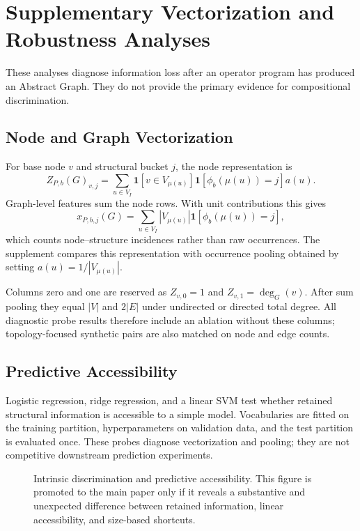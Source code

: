 \section{Supplementary Vectorization and Robustness Analyses}
\label{app:supplementary-results}

These analyses diagnose information loss after an operator program has produced
an Abstract Graph. They do not provide the primary evidence for compositional
discrimination.

\subsection{Node and Graph Vectorization}

For base node $v$ and structural bucket $j$, the node representation is
\begin{equation}
 Z_{P,b}(G)_{v,j}=\sum_{u\in V_I}
 \mathbf{1}[v\in V_{\mu(u)}]
 \mathbf{1}[\phi_b(\mu(u))=j]a(u).
\end{equation}
Graph-level features sum the node rows. With unit contributions this gives
\begin{equation}
 x_{P,b,j}(G)=\sum_{u\in V_I}|V_{\mu(u)}|
 \mathbf{1}[\phi_b(\mu(u))=j],
\end{equation}
which counts node--structure incidences rather than raw occurrences. The
supplement compares this representation with occurrence pooling obtained by
setting $a(u)=1/|V_{\mu(u)}|$.

Columns zero and one are reserved as $Z_{v,0}=1$ and
$Z_{v,1}=\deg_G(v)$. After sum pooling they equal $|V|$ and $2|E|$ under
undirected or directed total degree. All diagnostic probe results therefore
include an ablation without these columns; topology-focused synthetic pairs are
also matched on node and edge counts.

\subsection{Predictive Accessibility}

Logistic regression, ridge regression, and a linear SVM test whether retained
structural information is accessible to a simple model. Vocabularies are fitted
on the training partition, hyperparameters on validation data, and the test
partition is evaluated once. These probes diagnose vectorization and pooling;
they are not competitive downstream prediction experiments.

\begin{figure}[t]
  \centering
  \caption{Intrinsic discrimination and predictive accessibility. This figure
  is promoted to the main paper only if it reveals a substantive and unexpected
  difference between retained information, linear accessibility, and size-based
  shortcuts.}
  \label{fig:predictive-accessibility}
\end{figure}

